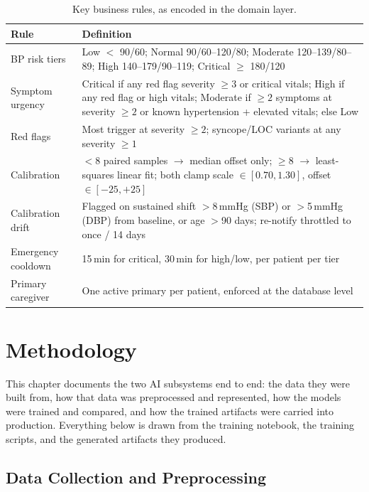 \documentclass[12pt,a4paper]{report}
\begin{document}
\begin{table}[H]
\centering
\caption{Key business rules, as encoded in the domain layer.}
\label{tab:rules}
\small
\begin{tabularx}{\linewidth}{@{}>{\raggedright\arraybackslash}p{3.6cm}Y@{}}
\toprule
\textbf{Rule} & \textbf{Definition} \\
\midrule
BP risk tiers & Low $<$ 90/60; Normal 90/60--120/80; Moderate 120--139/80--89; High 140--179/90--119; Critical $\ge$ 180/120 \\
Symptom urgency & Critical if any red flag severity $\ge 3$ or critical vitals; High if any red flag or high vitals; Moderate if $\ge 2$ symptoms at severity $\ge 2$ or known hypertension + elevated vitals; else Low \\
Red flags & Most trigger at severity $\ge 2$; syncope/LOC variants at any severity $\ge 1$ \\
Calibration & $<8$ paired samples $\rightarrow$ median offset only; $\ge 8$ $\rightarrow$ least-squares linear fit; both clamp scale $\in[0.70,1.30]$, offset $\in[-25,+25]$ \\
Calibration drift & Flagged on sustained shift $>$8\,mmHg (SBP) or $>$5\,mmHg (DBP) from baseline, or age $>$90 days; re-notify throttled to once / 14 days \\
Emergency cooldown & 15\,min for critical, 30\,min for high/low, per patient per tier \\
Primary caregiver & One active primary per patient, enforced at the database level \\
\bottomrule
\end{tabularx}
\end{table}


\chapter{Methodology}

This chapter documents the two AI subsystems end to end: the data they were
built from, how that data was preprocessed and represented, how the models were
trained and compared, and how the trained artifacts were carried into
production. Everything below is drawn from the training notebook, the training
scripts, and the generated artifacts they produced.

\section{Data Collection and Preprocessing}
\end{document}

